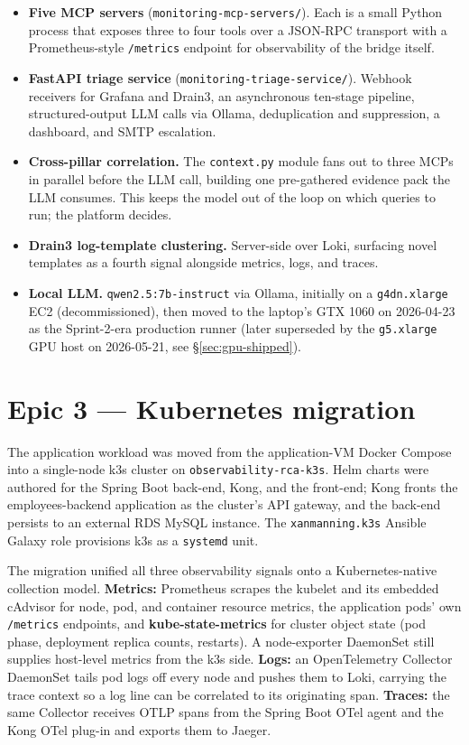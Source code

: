 \documentclass[11pt,a4paper,oneside]{report}
\begin{document}
\begin{itemize}
  \item \textbf{Five MCP servers}
        (\texttt{monitoring-mcp-servers/}).  Each is a small Python
        process that exposes three to four tools over a JSON-RPC
        transport with a Prometheus-style \texttt{/metrics} endpoint
        for observability of the bridge itself.
  \item \textbf{FastAPI triage service}
        (\texttt{monitoring-triage-service/}).  Webhook receivers for
        Grafana and Drain3, an asynchronous ten-stage pipeline,
        structured-output LLM calls via Ollama, deduplication and
        suppression, a dashboard, and SMTP escalation.
  \item \textbf{Cross-pillar correlation.}  The \texttt{context.py}
        module fans out to three MCPs in parallel before the LLM call,
        building one pre-gathered evidence pack the LLM consumes.  This
        keeps the model out of the loop on which queries to run; the
        platform decides.
  \item \textbf{Drain3 log-template clustering.}  Server-side over
        Loki, surfacing novel templates as a fourth signal alongside
        metrics, logs, and traces.
  \item \textbf{Local LLM.}  \texttt{qwen2.5:7b-instruct} via Ollama,
        initially on a \texttt{g4dn.xlarge} EC2 (decommissioned), then
        moved to the laptop's GTX 1060 on 2026-04-23 as the
        Sprint-2-era production runner (later superseded by the
        \texttt{g5.xlarge} GPU host on 2026-05-21, see
        \S\ref{sec:gpu-shipped}).
\end{itemize}

\section{Epic 3 --- Kubernetes migration}
\label{sec:k3s-migration}

The application workload was moved from the application-VM Docker
Compose into a single-node k3s cluster on
\texttt{observability-rca-k3s}.  Helm charts were authored for the
Spring Boot back-end, Kong, and the front-end; Kong fronts the
employees-backend application as the cluster's API gateway, and the
back-end persists to an external RDS MySQL instance.  The
\texttt{xanmanning.k3s} Ansible Galaxy role provisions k3s as a
\texttt{systemd} unit.

The migration unified all three observability signals onto a
Kubernetes-native collection model.  \textbf{Metrics:} Prometheus
scrapes the kubelet and its embedded cAdvisor for node, pod, and
container resource metrics, the application pods' own
\texttt{/metrics} endpoints, and \textbf{kube-state-metrics} for
cluster object state (pod phase, deployment replica counts, restarts).
A node-exporter DaemonSet still supplies host-level metrics from the
k3s side.  \textbf{Logs:} an OpenTelemetry Collector DaemonSet tails
pod logs off every node and pushes them to Loki, carrying the trace
context so a log line can be correlated to its originating span.
\textbf{Traces:} the same Collector receives OTLP spans from the
Spring Boot OTel agent and the Kong OTel plug-in and exports them to
Jaeger.
\end{document}
